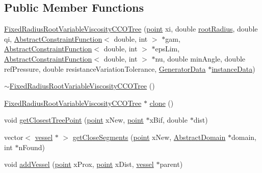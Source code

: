\subsection*{Public Member Functions}
\begin{DoxyCompactItemize}
\item 
\mbox{\hyperlink{class_fixed_radius_root_variable_viscosity_c_c_o_tree_a8b446e14c64faeedfe2b925ec227b5d8}{Fixed\+Radius\+Root\+Variable\+Viscosity\+C\+C\+O\+Tree}} (\mbox{\hyperlink{structpoint}{point}} xi, double \mbox{\hyperlink{class_fixed_radius_root_variable_viscosity_c_c_o_tree_a7a804189732bccc4ab8bbf7ca775a6ac}{root\+Radius}}, double qi, \mbox{\hyperlink{class_abstract_constraint_function}{Abstract\+Constraint\+Function}}$<$ double, int $>$ $\ast$gam, \mbox{\hyperlink{class_abstract_constraint_function}{Abstract\+Constraint\+Function}}$<$ double, int $>$ $\ast$eps\+Lim, \mbox{\hyperlink{class_abstract_constraint_function}{Abstract\+Constraint\+Function}}$<$ double, int $>$ $\ast$nu, double min\+Angle, double ref\+Pressure, double resistance\+Variation\+Tolerance, \mbox{\hyperlink{class_generator_data}{Generator\+Data}} $\ast$\mbox{\hyperlink{class_abstract_c_c_o_tree_afd240b7fad46ddf0a2ed78558cc9b9ca}{instance\+Data}})
\item 
\mbox{\hyperlink{class_fixed_radius_root_variable_viscosity_c_c_o_tree_a4c0d8b01e34db22d79faf4b4906e3c06}{$\sim$\+Fixed\+Radius\+Root\+Variable\+Viscosity\+C\+C\+O\+Tree}} ()
\item 
\mbox{\hyperlink{class_fixed_radius_root_variable_viscosity_c_c_o_tree}{Fixed\+Radius\+Root\+Variable\+Viscosity\+C\+C\+O\+Tree}} $\ast$ \mbox{\hyperlink{class_fixed_radius_root_variable_viscosity_c_c_o_tree_a0389e2b36c990dfa2cce140bc186b1f5}{clone}} ()
\item 
void \mbox{\hyperlink{class_fixed_radius_root_variable_viscosity_c_c_o_tree_aa3f90cff4eb94084830cf3fbabe8023b}{get\+Closest\+Tree\+Point}} (\mbox{\hyperlink{structpoint}{point}} x\+New, \mbox{\hyperlink{structpoint}{point}} $\ast$x\+Bif, double $\ast$dist)
\item 
vector$<$ \mbox{\hyperlink{structvessel}{vessel}} $\ast$ $>$ \mbox{\hyperlink{class_fixed_radius_root_variable_viscosity_c_c_o_tree_ae7a54cd9971cea1ed9b94e2c5f874e78}{get\+Close\+Segments}} (\mbox{\hyperlink{structpoint}{point}} x\+New, \mbox{\hyperlink{class_abstract_domain}{Abstract\+Domain}} $\ast$domain, int $\ast$n\+Found)
\item 
void \mbox{\hyperlink{class_fixed_radius_root_variable_viscosity_c_c_o_tree_a76edd9c8900d98ee4748c6449fe68a9e}{add\+Vessel}} (\mbox{\hyperlink{structpoint}{point}} x\+Prox, \mbox{\hyperlink{structpoint}{point}} x\+Dist, \mbox{\hyperlink{structvessel}{vessel}} $\ast$parent)

\end{DoxyCompactItemize}

